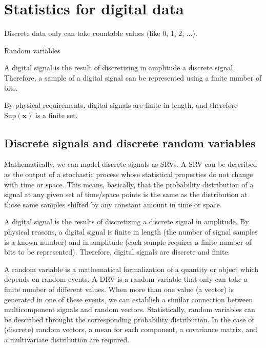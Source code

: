 \chapter{Statistics for digital data}


Discrete data only can take countable values (like 0, 1, 2, ...).

Random variables

A digital signal is the result of discretizing in amplitude a discrete
signal. Therefore, a sample of a digital signal can be represented
using a finite number of bits.

By physical requirements, digital signals are finite in length, and therefore
$\text{Sup}(\mathbf{x})$ is a finite set.

\section{Discrete signals and discrete random variables}
\label{sec:DSRV}

Mathematically, we can model discrete signals as \glspl{SRV}. A
\gls{SRV} can be described as the output of a stochastic process whose
statistical properties do not change with time or space. This means,
basically, that the probability distribution of a signal at any given
set of time/space points is the same as the distribution at those same
samples shifted by any constant amount in time or space.

A digital signal is the results of discretizing a discrete signal in
amplitude. By physical reasons, a digital signal is finite in length
(the number of signal samples is a known number) and in amplitude
(each sample requires a finite number of bits to be
represented). Therefore, digital signals are discrete and finite.

A random variable is a mathematical formalization of a quantity or
object which depends on random events. A \gls{DRV} is a random
variable that only can take a finite number of different values. When
more than one value (a vector) is generated in one of these events, we
can establish a similar connection between multicomponent signals and
random vectors. Statistically, random variables can be described
throught the corresponding probability
distribution. In the case of (discrete) random vectors, a mean for each
component, a covariance matrix, and a multivariate distribution are
required.

